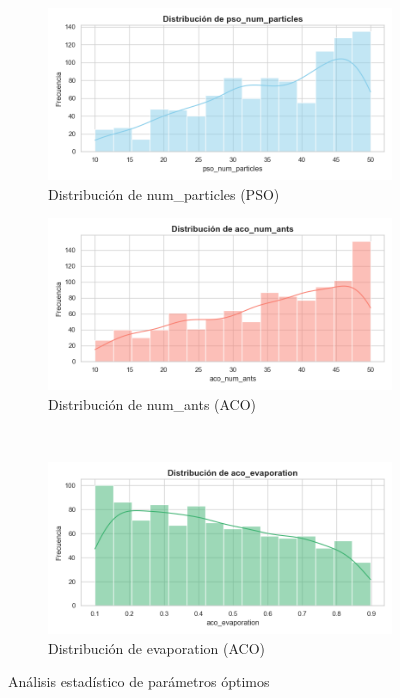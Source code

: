 \documentclass{article}
\begin{document}
\begin{figure}[H]
\centering
\begin{subfigure}{0.45\textwidth}
    \includegraphics[width=\textwidth]{pso_num_particles_dist.png}
    \caption{Distribución de num\_particles (PSO)}
\end{subfigure}
\hfill
\begin{subfigure}{0.45\textwidth}
    \includegraphics[width=\textwidth]{aco_num_ants_dist.png}
    \caption{Distribución de num\_ants (ACO)}
\end{subfigure}
\\
\begin{subfigure}{0.6\textwidth}
    \includegraphics[width=\textwidth]{aco_evaporation_dist.png}
    \caption{Distribución de evaporation (ACO)}
\end{subfigure}
\caption{Análisis estadístico de parámetros óptimos}
\end{figure}
\end{document}
